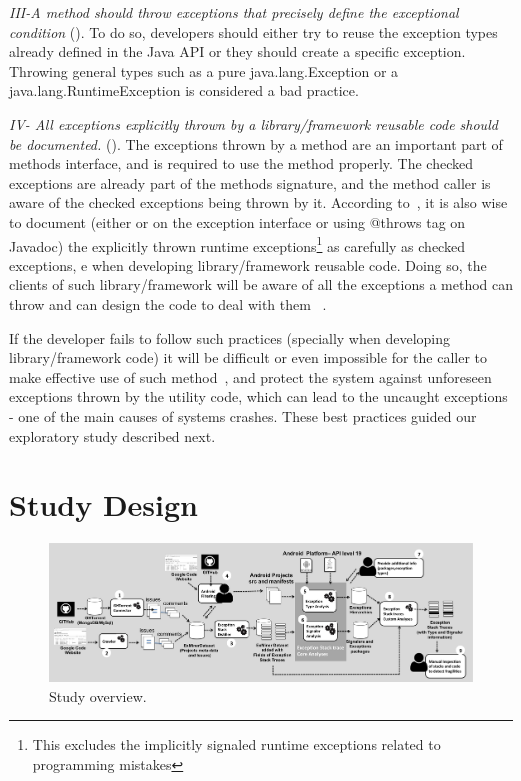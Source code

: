 \documentclass[conference]{IEEEtran}
\begin{document}

\emph{III-A method should throw exceptions that precisely define the
exceptional condition} (\cite{gosling2000java,bloch2008effective}). To do so,
developers should either try to reuse the exception types already defined in the
Java API or they should create a specific exception. Throwing general types such as a
pure java.lang.Exception or a java.lang.RuntimeException is considered a bad practice.


\emph{IV- All exceptions explicitly thrown by a library/framework reusable code should be documented.}
(\cite{mandrioli1992advances,gosling2000java,wirfs2006toward,bloch2008effective}).
The exceptions thrown by a method are an important part of methods interface,
and is required to use the method properly. The checked exceptions are already
part of the  methods signature, and the method caller is aware of the checked
exceptions being thrown by it. According to~\cite{bloch2008effective}, it is
also wise to document  (either or on the exception interface or using @throws tag on Javadoc) 
the explicitly thrown runtime exceptions\footnote{This
excludes the implicitly signaled runtime exceptions related to programming
mistakes} as carefully as checked exceptions, e when developing
 library/framework reusable code. Doing so, the clients of such library/framework
will be aware of all the exceptions a method can throw and can design the code
to deal with them ~\cite{Robil00}. 

If the developer fails to follow such practices (specially when developing 
library/framework code) it will be difficult or even impossible for the caller to 
make effective use of such method~\cite{wirfs2006toward, bloch2008effective},
and protect the system against unforeseen exceptions thrown by the utility code,
which can lead to the uncaught exceptions - one of the main causes of 
systems crashes. These best practices guided our exploratory study described next.


\section{Study Design}
\label{sec:study}


\begin{figure} \centering \includegraphics[scale=0.3]{studyoverview3.png}
\caption{Study overview.} \label{fig:overview} \end{figure}
\end{document}
